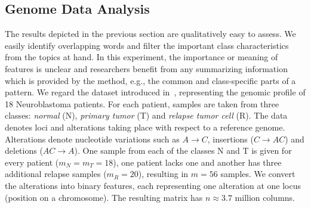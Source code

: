 \subsection{Genome Data Analysis}\label{sec:CS:gene}
The results depicted in the previous section are qualitatively easy to assess. We easily identify overlapping words and filter the important class characteristics from the topics at hand. 
In this experiment, the importance or meaning of features is unclear and researchers benefit from any summarizing information which is provided by the method, e.g., the common and class-specific parts of a pattern.
We regard the dataset introduced in~\cite{schramm2015mutational}, representing the genomic profile of 18 Neuroblastoma patients. For each patient, samples are taken from three classes: \emph{normal} (N), \emph{primary tumor} (T) and \emph{relapse tumor  cell} (R). The data denotes loci and alterations taking place with respect to a reference genome. Alterations denote nucleotide variations such as $A\rightarrow C$, insertions ($C\rightarrow AC$) and deletions ($AC\rightarrow A$). One sample from each of the classes N and T is given for every patient ($m_N=m_T=18$), one patient lacks one and another has three additional relapse samples ($m_R=20$), resulting in $m=56$ samples.   
We convert the alterations into binary features, each representing one alteration at one locus (position on a chromosome). The resulting matrix has $n\approx 3.7$ million columns.
